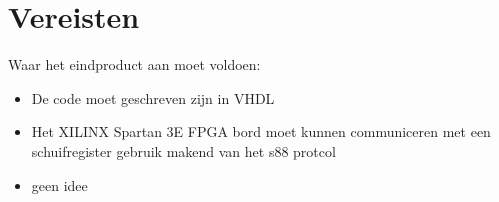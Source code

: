 \chapter{Vereisten}

Waar het eindproduct aan moet voldoen:
\begin{itemize}
	\item De code moet geschreven zijn in VHDL
	\item Het XILINX Spartan 3E FPGA bord moet kunnen communiceren met een schuifregister gebruik makend van het s88 protcol
	 \item geen idee
\end{itemize}